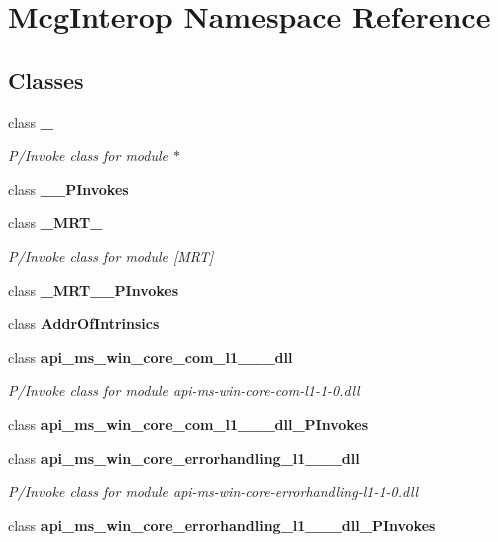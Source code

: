 \hypertarget{namespace_mcg_interop}{}\section{Mcg\+Interop Namespace Reference}
\label{namespace_mcg_interop}
\subsection*{Classes}
\begin{DoxyCompactItemize}
\item 
class {\bfseries \+\_\+}
\begin{DoxyCompactList}\small\item\em P/\+Invoke class for module \textquotesingle{}$\ast$\textquotesingle{} \end{DoxyCompactList}\item 
class {\bfseries \+\_\+\+\_\+\+P\+Invokes}
\item 
class {\bfseries \+\_\+\+M\+R\+T\+\_\+}
\begin{DoxyCompactList}\small\item\em P/\+Invoke class for module \textquotesingle{}\mbox{[}M\+RT\mbox{]}\textquotesingle{} \end{DoxyCompactList}\item 
class {\bfseries \+\_\+\+M\+R\+T\+\_\+\+\_\+\+P\+Invokes}
\item 
class {\bfseries Addr\+Of\+Intrinsics}
\item 
class {\bfseries api\+\_\+ms\+\_\+win\+\_\+core\+\_\+com\+\_\+l1\+\_\+\_\+\_\+dll}
\begin{DoxyCompactList}\small\item\em P/\+Invoke class for module \textquotesingle{}api-\/ms-\/win-\/core-\/com-\/l1-\/1-\/0.\+dll\textquotesingle{} \end{DoxyCompactList}\item 
class {\bfseries api\+\_\+ms\+\_\+win\+\_\+core\+\_\+com\+\_\+l1\+\_\+\_\+\_\+dll\+\_\+\+P\+Invokes}
\item 
class {\bfseries api\+\_\+ms\+\_\+win\+\_\+core\+\_\+errorhandling\+\_\+l1\+\_\+\_\+\_\+dll}
\begin{DoxyCompactList}\small\item\em P/\+Invoke class for module \textquotesingle{}api-\/ms-\/win-\/core-\/errorhandling-\/l1-\/1-\/0.\+dll\textquotesingle{} \end{DoxyCompactList}\item 
class {\bfseries api\+\_\+ms\+\_\+win\+\_\+core\+\_\+errorhandling\+\_\+l1\+\_\+\_\+\_\+dll\+\_\+\+P\+Invokes}

\end{DoxyCompactItemize}
